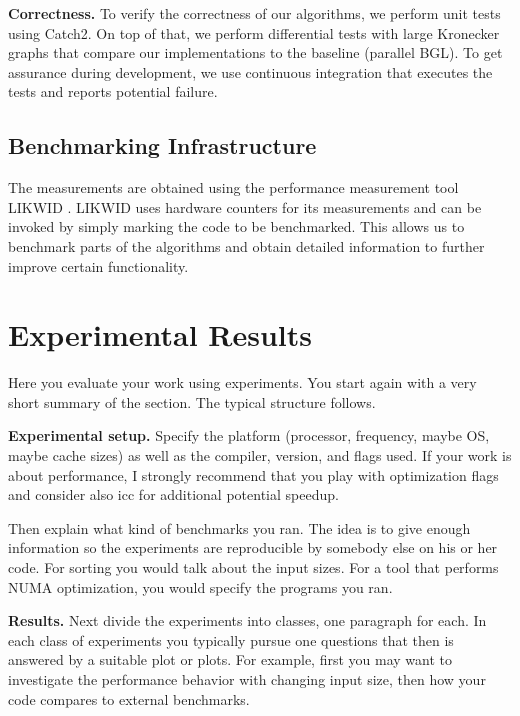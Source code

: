 \documentclass[letterpaper]{article}
\newcommand{\mypar}[1]{{\bf #1.}}
\begin{document}
\mypar{Correctness}
To verify the correctness of our algorithms, we perform unit tests using Catch2. On top of that, we perform differential
tests with large Kronecker graphs that compare our implementations to the baseline (parallel BGL). To get assurance
during development, we use continuous integration that executes the tests and reports potential failure.

\subsection{Benchmarking Infrastructure}
The measurements are obtained using the performance measurement tool LIKWID \cite{treibig2010likwid}. LIKWID uses
hardware counters for its measurements and can be invoked by simply marking the code to be benchmarked. This allows us
to benchmark parts of the algorithms and obtain detailed information to further improve certain functionality.

\section{Experimental Results}\label{sec:exp}

Here you evaluate your work using experiments. You start again with a
very short summary of the section. The typical structure follows.

\mypar{Experimental setup} Specify the platform (processor, frequency, maybe OS, maybe cache sizes)
as well as the compiler, version, and flags used. If your work is about performance, 
I strongly recommend that you play with optimization flags and consider also icc for additional potential speedup.

Then explain what kind of benchmarks you ran. The idea is to give enough information so the experiments are reproducible by somebody else on his or her code.
For sorting you would talk about the input sizes. For a tool that performs NUMA optimization, you would specify the programs you ran.

\mypar{Results}
Next divide the experiments into classes, one paragraph for each. In each class of experiments you typically pursue one questions that then is answered by a suitable plot or plots. For example, first you may want to investigate the performance behavior with changing input size, then how your code compares to external benchmarks.
\end{document}

